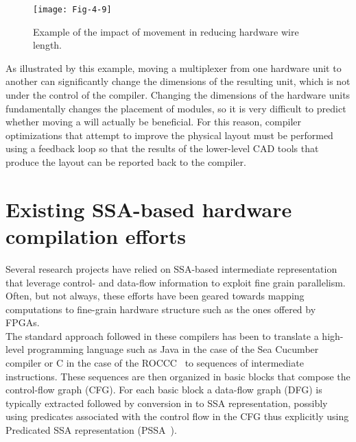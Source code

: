 \begin{figure}[thbp]
\centering
\texttt{[image: Fig-4-9]}
\caption{Example of the impact of \phifun movement in
reducing hardware wire length.}
\label{fig:Fig.4.9}
\end{figure}

As illustrated by this example, moving a multiplexer from one hardware 
unit to another can significantly change the dimensions of the resulting 
unit, which is not under the control of the compiler. Changing the 
dimensions of the hardware units fundamentally changes the placement 
of modules, so it is very difficult to predict whether moving a 
\phifun will actually be beneficial. For this reason, compiler 
optimizations that attempt to improve the physical layout must be 
performed using a feedback loop so that the results of the 
lower-level CAD tools that produce the layout can be reported 
back to the compiler.\\

\section{Existing SSA-based hardware compilation efforts}

Several research projects have relied on SSA-based intermediate representation 
that leverage control- and data-flow information to exploit fine grain parallelism. 
Often, but not always, these efforts have been geared towards mapping computations 
to fine-grain hardware structure such as the ones offered by FPGAs.\\

The standard approach followed in these compilers has been to 
translate a high-level programming language such as Java in 
the case of the Sea Cucumber~\cite{Tripp:FPL02} compiler or 
C in the case of the ROCCC~\cite{Najjar:ROCCC08} to sequences 
of intermediate instructions. These sequences are then organized 
in basic blocks that compose the control-flow graph (CFG). 
For each basic block a data-flow graph (DFG) is typically extracted 
followed by conversion in to SSA representation, possibly using 
predicates associated with the control flow in the CFG thus 
explicitly using Predicated SSA representation 
(PSSA~\cite{Carter:PACT99,deFerriere:SCOPES07,Stoutchinin:2001:MICRO}).\\

